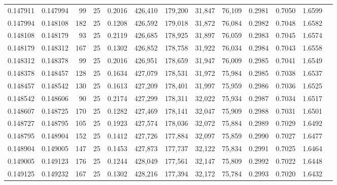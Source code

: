 \begin{tabular}{rrrrrrrrrrrrr}
0.147911 & 0.147994 &    99 &  25 &                                     0.2016 & 426,410 & 179,200 &  31,847 &  76,109 & 0.2981 & 0.7050 & 1.6599 \\
0.147994 & 0.148108 &   182 &  25 &                                     0.1208 & 426,592 & 179,018 &  31,872 &  76,084 & 0.2982 & 0.7048 & 1.6582 \\
0.148108 & 0.148179 &    93 &  25 &                                     0.2119 & 426,685 & 178,925 &  31,897 &  76,059 & 0.2983 & 0.7045 & 1.6574 \\
0.148179 & 0.148312 &   167 &  25 &                                     0.1302 & 426,852 & 178,758 &  31,922 &  76,034 & 0.2984 & 0.7043 & 1.6558 \\
0.148312 & 0.148378 &    99 &  25 &                                     0.2016 & 426,951 & 178,659 &  31,947 &  76,009 & 0.2985 & 0.7041 & 1.6549 \\
0.148378 & 0.148457 &   128 &  25 &                                     0.1634 & 427,079 & 178,531 &  31,972 &  75,984 & 0.2985 & 0.7038 & 1.6537 \\
0.148457 & 0.148542 &   130 &  25 &                                     0.1613 & 427,209 & 178,401 &  31,997 &  75,959 & 0.2986 & 0.7036 & 1.6525 \\
0.148542 & 0.148606 &    90 &  25 &                                     0.2174 & 427,299 & 178,311 &  32,022 &  75,934 & 0.2987 & 0.7034 & 1.6517 \\
0.148607 & 0.148725 &   170 &  25 &                                     0.1282 & 427,469 & 178,141 &  32,047 &  75,909 & 0.2988 & 0.7031 & 1.6501 \\
0.148727 & 0.148795 &   105 &  25 &                                     0.1923 & 427,574 & 178,036 &  32,072 &  75,884 & 0.2989 & 0.7029 & 1.6492 \\
0.148795 & 0.148904 &   152 &  25 &                                     0.1412 & 427,726 & 177,884 &  32,097 &  75,859 & 0.2990 & 0.7027 & 1.6477 \\
0.148904 & 0.149005 &   147 &  25 &                                     0.1453 & 427,873 & 177,737 &  32,122 &  75,834 & 0.2991 & 0.7025 & 1.6464 \\
0.149005 & 0.149123 &   176 &  25 &                                     0.1244 & 428,049 & 177,561 &  32,147 &  75,809 & 0.2992 & 0.7022 & 1.6448 \\
0.149125 & 0.149232 &   167 &  25 &                                     0.1302 & 428,216 & 177,394 &  32,172 &  75,784 & 0.2993 & 0.7020 & 1.6432 \\

\end{tabular}
